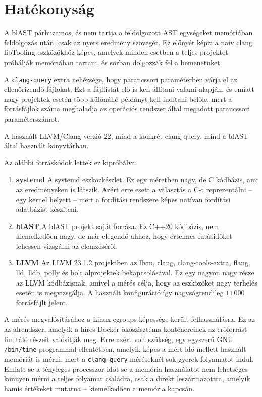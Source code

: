 \chapter{Hatékonyság}\label{ch:perf}

A blAST párhuzamos, és nem tartja a feldolgozott \gls{AST} egységeket memóriában feldolgozás után, csak az nyers eredmény szövegét.
Ez előnyét képzi a naiv clang libTooling eszközökhöz képes, amelyek minden esetben a teljes projektet próbálják memóriában tartani, és sorban dolgozzák fel a bemenetüket.

A {\tt clang-query} extra nehézsége, hogy parancssori paraméterben várja el az ellenőrizendő fájlokat.
Ezt a fájllistát elő is kell állítani valami alapján, és emiatt nagy projektek esetén több különálló példányt kell indítani belőle, mert a forrásfájlok száma meghaladja az operációs rendszer által megadott parancssori paraméterszámot.

A használt LLVM/Clang verzió 22, mind a konkrét clang-query, mind a blAST által használt könyvtárban.

Az alábbi forráskódok lettek ez kipróbálva: 
\begin{enumerate}
\item {\bf systemd} A systemd eszközkészlet.
Ez egy méretben nagy, de C kódbázis, ami az eredményeken is látszik.
Azért erre esett a választás a C-t reprezentálni -- \pl egy kernel helyett -- mert a fordítási rendszere képes natívan fordítási adatbázist készíteni.
\item {\bf blAST} A blAST projekt saját forrása.
Ez C++20 kódbázis, nem kiemelkedően nagy, de már elegendő ahhoz, hogy értelmes futásidőket lehessen vizsgálni az elemzéséről.
\item {\bf LLVM} Az LLVM 23.1.2 projektben az llvm, clang, clang-tools-extra, flang, lld, lldb, polly és bolt alprojektek bekapcsolásával.
Ez egy nagyon nagy része az LLVM kódbázisnak, amivel a mérés célja, hogy az eszközöket nagy terhelés esetén is megvizsgálja.
A használt konfiguráció így nagyságrendileg $11\,000$ forrásfájlt jelent.
\end{enumerate}

A mérés megvalósításához a Linux cgroups képessége került felhasználásra.
Ez az az alrendszer, amelyik a híres Docker ökoszisztéma konténereinek az erőforrást limitáló részeit valósítják meg.
Erre azért volt szükség, \pl egy egyszerű GNU {\tt /bin/time} programmal ellentétben, amelyik képes a mért idő mellett használt memóriát is mérni, mert a {\tt clang-query} méréseknél sok gyerek folyamatot indul.
Emiatt se a tényleges processzor-időt se a memória használatot nem lehetséges könnyen mérni a teljes folyamat családra, csak a direkt leszármazottra, amelyik hamis értékeket mutatna -- kiemelkedően a memória kapcsán.

